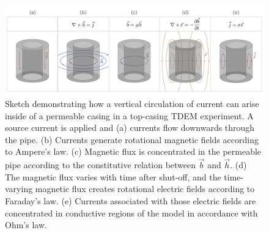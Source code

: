 \begin{figure}
    \begin{center}
    \includegraphics[width=\textwidth]{figures/em_casing/casing-mu-sketch.png}
    \end{center}
\caption{
    Sketch demonstrating how a vertical circulation of current can arise inside of a permeable casing in a top-casing TDEM experiment.
    A source current is applied and (a) currents flow downwards through the pipe. (b) Currents generate rotational magnetic fields according
    to Ampere's law. (c) Magnetic flux is concentrated in the permeable pipe according to the constitutive relation between $\vec{b}$ and $\vec{h}$.
    (d) The magnetic flux varies with time after shut-off, and the time-varying magnetic flux creates rotational electric fields according to Faraday's law.
    (e) Currents associated with those electric fields are concentrated in conductive regions of the model in accordance with Ohm's law.
}
\label{fig:casing-mu-sketch}
\end{figure}




